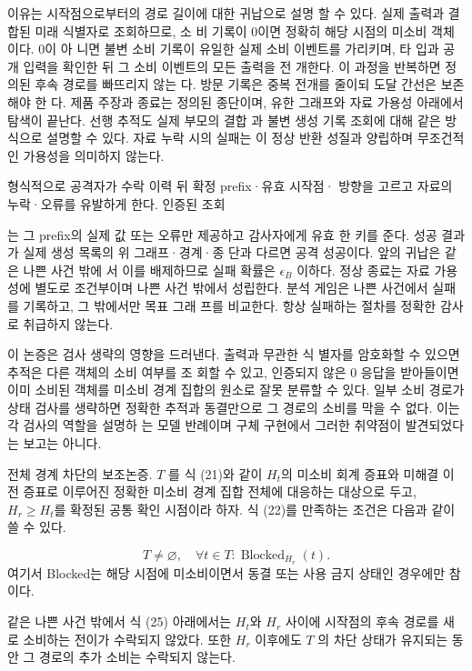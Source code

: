 이유는 시작점으로부터의 경로 길이에 대한 귀납으로 설명
할 수 있다. 실제 출력과 결합된 미래 식별자로 조회하므로, 소
비 기록이 0이면 정확히 해당 시점의 미소비 객체이다. 0이 아
니면 불변 소비 기록이 유일한 실제 소비 이벤트를 가리키며, 타
입과 공개 입력을 확인한 뒤 그 소비 이벤트의 모든 출력을 전
개한다. 이 과정을 반복하면 정의된 후속 경로를 빠뜨리지 않는
다. 방문 기록은 중복 전개를 줄이되 도달 간선은 보존해야 한
다. 제품 주장과 종료는 정의된 종단이며, 유한 그래프와 자료
가용성 아래에서 탐색이 끝난다. 선행 추적도 실제 부모의 결합
과 불변 생성 기록 조회에 대해 같은 방식으로 설명할 수 있다.
자료 누락 시의 실패는 이 정상 반환 성질과 양립하며 무조건적
인 가용성을 의미하지 않는다.

형식적으로 공격자가 수락 이력 뒤 확정 prefix·유효 시작점·
방향을 고르고 자료의 누락·오류를 유발하게 한다. 인증된 조회

는 그 prefix의 실제 값 또는 오류만 제공하고 감사자에게 유효
한 키를 준다. 성공 결과가 실제 생성 목록의 위 그래프·경계·종
단과 다르면 공격 성공이다. 앞의 귀납은 같은 나쁜 사건 밖에
서 이를 배제하므로 실패 확률은 \(\epsilon _{B}\) 이하다. 정상 종료는 자료
가용성에 별도로 조건부이며 나쁜 사건 밖에서 성립한다. 분석
게임은 나쁜 사건에서 실패를 기록하고, 그 밖에서만 목표 그래
프를 비교한다. 항상 실패하는 절차를 정확한 감사로 취급하지
않는다.

이 논증은 검사 생략의 영향을 드러낸다. 출력과 무관한 식
별자를 암호화할 수 있으면 추적은 다른 객체의 소비 여부를 조
회할 수 있고, 인증되지 않은 0 응답을 받아들이면 이미 소비된
객체를 미소비 경계 집합의 원소로 잘못 분류할 수 있다. 일부
소비 경로가 상태 검사를 생략하면 정확한 추적과 동결만으로
그 경로의 소비를 막을 수 없다. 이는 각 검사의 역할을 설명하
는 모델 반례이며 구체 구현에서 그러한 취약점이 발견되었다
는 보고는 아니다.

전체 경계 차단의 보조논증. \(T\) 를 식 (21)와 같이 \(H_{t}\)의 미소비
회계 증표와 미해결 이전 증표로 이루어진 정확한 미소비 경계
집합 전체에 대응하는 대상으로 두고, \(H_{r}≥H_{t}\)를 확정된 공통
확인 시점이라 하자. 식 (22)를 만족하는 조건은 다음과 같이 쓸
수 있다.

\begin{equation}
    T\ne\varnothing,\quad\forall t\in T:\operatorname{Blocked}_{H_r}(t).\tag{25}
\end{equation}
여기서 Blocked는 해당 시점에 미소비이면서 동결 또는 사용
금지 상태인 경우에만 참이다.

같은 나쁜 사건 밖에서 식 (25) 아래에서는 \(H_{t}\)와 \(H_{r}\) 사이에
시작점의 후속 경로를 새로 소비하는 전이가 수락되지 않았다.
또한 \(H_{r}\) 이후에도 \(T\) 의 차단 상태가 유지되는 동안 그 경로의
추가 소비는 수락되지 않는다.

